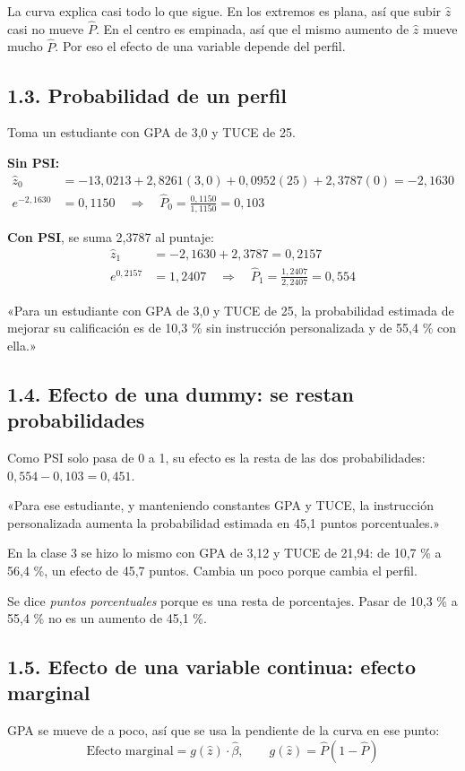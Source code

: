 \documentclass[11pt,letterpaper]{article}
\newcommand{\tema}[1]{\subsection*{#1}}
\newcommand{\Ph}{\hat{P}}
\newcommand{\zh}{\hat{z}}
\begin{document}
La curva explica casi todo lo que sigue. En los extremos es plana, así que subir $\zh$ casi no mueve $\Ph$. En el centro es empinada, así que el mismo aumento de $\zh$ mueve mucho $\Ph$. Por eso el efecto de una variable depende del perfil.

\tema{1.3. Probabilidad de un perfil}

Toma un estudiante con GPA de 3,0 y TUCE de 25.

\textbf{Sin PSI:}
\begin{align*}
\zh_0&=-13{,}0213+2{,}8261(3{,}0)+0{,}0952(25)+2{,}3787(0)=-2{,}1630\\
e^{-2{,}1630}&=0{,}1150\quad\Rightarrow\quad \Ph_0=\frac{0{,}1150}{1{,}1150}=0{,}103
\end{align*}

\textbf{Con PSI}, se suma 2,3787 al puntaje:
\begin{align*}
\zh_1&=-2{,}1630+2{,}3787=0{,}2157\\
e^{0{,}2157}&=1{,}2407\quad\Rightarrow\quad \Ph_1=\frac{1{,}2407}{2{,}2407}=0{,}554
\end{align*}

\begin{frase}
«Para un estudiante con GPA de 3,0 y TUCE de 25, la probabilidad estimada de mejorar su calificación es de 10,3 \% sin instrucción personalizada y de 55,4 \% con ella.»
\end{frase}

\tema{1.4. Efecto de una dummy: se restan probabilidades}

Como PSI solo pasa de 0 a 1, su efecto es la resta de las dos probabilidades: $0{,}554-0{,}103=0{,}451$.

\begin{frase}
«Para ese estudiante, y manteniendo constantes GPA y TUCE, la instrucción personalizada aumenta la probabilidad estimada en 45,1 puntos porcentuales.»
\end{frase}

En la clase 3 se hizo lo mismo con GPA de 3,12 y TUCE de 21,94: de 10,7 \% a 56,4 \%, un efecto de 45,7 puntos. Cambia un poco porque cambia el perfil.

Se dice \emph{puntos porcentuales} porque es una resta de porcentajes. Pasar de 10,3 \% a 55,4 \% no es un aumento de 45,1 \%.

\tema{1.5. Efecto de una variable continua: efecto marginal}

GPA se mueve de a poco, así que se usa la pendiente de la curva en ese punto:
\[
\text{Efecto marginal}=g(\zh)\cdot\hat\beta,\qquad g(\zh)=\Ph(1-\Ph)
\]
\end{document}

